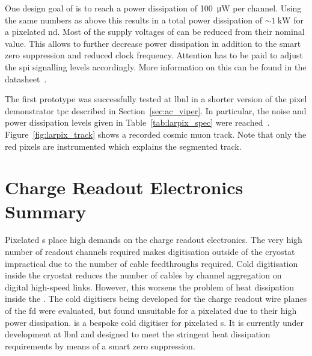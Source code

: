 One design goal of \larpix{} is to reach a power dissipation of \SI{100}{\micro\watt} per channel.
Using the same numbers as above this results in a total power dissipation of $\sim \SI{1}{\kilo\watt}$ for a pixelated \dune{} \gls{nd}.
Most of the supply voltages of \larpix{} can be reduced from their nominal value.
This allows to further decrease power dissipation in addition to the smart zero suppression and reduced clock frequency.
Attention has to be paid to adjust the \gls{spi} signalling levels accordingly.
More information on this can be found in the datasheet~\cite{larpix_spec}.

The first \larpix{} prototype was successfully tested at \gls{lbnl} in a shorter version of the pixel demonstrator \gls{tpc} described in Section~\ref{sec:ac_viper}.
In particular, the noise and power dissipation levels given in Table~\ref{tab:larpix_spec} were reached~\cite{dan_larpix_duneCM}.
Figure~\ref{fig:larpix_track} shows a recorded cosmic muon track.
Note that only the red pixels are instrumented which explains the segmented track.

\section{Charge Readout Electronics Summary}
\label{sec:studies_electronics-summary}

Pixelated \lartpc{}s place high demands on the charge readout electronics.
The very high number of readout channels required makes digitisation outside of the cryostat impractical due to the number of cable feedthroughs required.
Cold digitisation inside the cryostat reduces the number of cables by channel aggregation on digital high-speed links.
However, this worsens the problem of heat dissipation inside the \lar{}.
The cold digitisers being developed for the charge readout wire planes of the \dune{} \gls{fd} were evaluated, but found unsuitable for a pixelated \lartpc{} due to their high power dissipation.
\larpix{} is a bespoke cold digitiser for pixelated \lartpc{}s.
It is currently under development at \gls{lbnl} and designed to meet the stringent heat dissipation requirements by means of a smart zero suppression.
